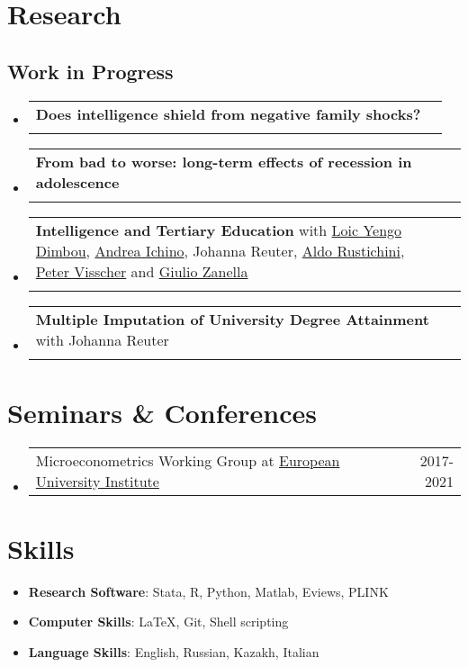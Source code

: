 \documentclass[a4, 11pt]{article}
\makeatletter
\newcommand{\resumePublicationHeading}[3]{
        \item
        \begin{tabularx}{0.97\textwidth}{X@{\extracolsep{2em}}r}
          #1 & #2 \\
          \multicolumn{2}{l}{\textit{\small#3}}
        \end{tabularx}
    }
\newcommand{\resumeOtherHeading}[2]{
      \item
      \begin{tabularx}{0.97\textwidth}{X@{\extracolsep{2em}}r}
        #1 & #2
      \end{tabularx}
    }
\newcommand{\resumeSubHeadingListStart}{\begin{itemize}[leftmargin=0.15in, label={}]}
\newcommand{\resumeSubHeadingListEnd}{\end{itemize}}
\makeatother
\begin{document}
    \section*{Research}\subsection{Work in Progress}
        \resumeSubHeadingListStart    \resumePublicationHeading
      { \textbf{Does intelligence shield from negative family shocks?} }
      {}
      {}    \resumePublicationHeading
      { \textbf{From bad to worse: long-term effects of recession in adolescence} }
      {}
      {}    \resumePublicationHeading
      { \textbf{Intelligence and Tertiary Education} with \href{https://researchers.uq.edu.au/researcher/14187}{Loic Yengo Dimbou},
      \href{http://www.andreaichino.it}{Andrea Ichino},
      Johanna Reuter,
      \href{https://sites.google.com/site/aldorustichini/}{Aldo Rustichini},
      \href{https://qbi.uq.edu.au/profile/721/peter-visscher}{Peter Visscher} and 
      \href{https://sites.google.com/site/giuliozanella/}{Giulio Zanella} }
      {}
      {}    \resumePublicationHeading
      { \textbf{Multiple Imputation of University Degree Attainment} with Johanna Reuter }
      {}
      {}\resumeSubHeadingListEnd


    \section*{Seminars \& Conferences}
  \resumeSubHeadingListStart
        \resumeOtherHeading
          {{Microeconometrics Working Group} at \href{https://www.eui.eu}{European University Institute} }
          { 2017-2021 }
    \resumeSubHeadingListEnd


    \section{Skills}\begin{itemize}[leftmargin=0.15in, label = {}]
      \item \small{ \textbf{Research Software}: Stata, R, Python, Matlab, Eviews, PLINK}
      \item \small{ \textbf{Computer Skills}: LaTeX, Git, Shell scripting}
      \item \small{ \textbf{Language Skills}: English, Russian, Kazakh, Italian}
  \end{itemize}


\end{document}
